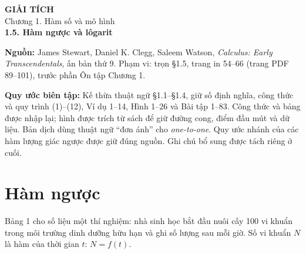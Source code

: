 \documentclass[12pt,a4paper]{article}
\begin{document}
\begin{center}
{\Large\bfseries GIẢI TÍCH}\\[5pt]
{\large Chương 1. Hàm số và mô hình}\\[9pt]
{\Large\bfseries 1.5. Hàm ngược và lôgarit}
\end{center}
\noindent\textbf{Nguồn:} James Stewart, Daniel K. Clegg, Saleem Watson, \textit{Calculus: Early Transcendentals}, ấn bản thứ 9. Phạm vi: trọn §1.5, trang in 54–66 (trang PDF 89–101), trước phần Ôn tập Chương 1.

\noindent\textbf{Quy ước biên tập:} Kế thừa thuật ngữ §1.1–§1.4, giữ số định nghĩa, công thức và quy trình (1)–(12), Ví dụ 1–14, Hình 1–26 và Bài tập 1–83. Công thức và bảng được nhập lại; hình được trích từ sách để giữ đường cong, điểm đầu mút và dữ liệu. Bản dịch dùng thuật ngữ ``đơn ánh'' cho \textit{one-to-one}. Quy ước nhánh của các hàm lượng giác ngược được giữ đúng nguồn. Ghi chú bổ sung được tách riêng ở cuối.

\section*{Hàm ngược}
Bảng 1 cho số liệu một thí nghiệm: nhà sinh học bắt đầu nuôi cấy 100 vi khuẩn trong môi trường dinh dưỡng hữu hạn và ghi số lượng sau mỗi giờ. Số vi khuẩn $N$ là hàm của thời gian $t$: $N=f(t)$.
\end{document}

